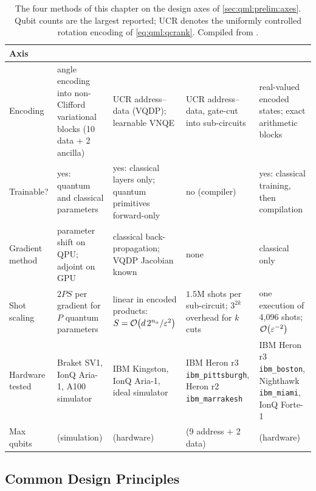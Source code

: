 \begin{table}[htbp]
\caption{The four methods of this chapter on the design axes of \cref{sec:qml:prelim:axes}. Qubit counts are the largest reported; UCR denotes the uniformly controlled rotation encoding of \cref{eq:qml:qcrank}. Compiled from \cite{guo2025qpie,guo2025vqt,guo2025shardq,guo2026nnqa}.}\label{tab:qml:synthesis}
\centering
\footnotesize
\setlength{\tabcolsep}{4pt}
\begin{tabular}{@{}>{\raggedright\arraybackslash}p{1.9cm}>{\raggedright\arraybackslash}p{2.9cm}>{\raggedright\arraybackslash}p{2.9cm}>{\raggedright\arraybackslash}p{2.9cm}>{\raggedright\arraybackslash}p{2.9cm}@{}}
\toprule
Axis & \qpie{} & \vqt{} & \shardq{} & \nnqa{} \\
\midrule
Encoding & angle encoding into non-Clifford variational blocks (10 data $+$ 2 ancilla) & UCR address--data (VQDP); learnable VNQE & UCR address--data, gate-cut into sub-circuits & real-valued encoded states; exact arithmetic blocks \\
\addlinespace
Trainable? & yes: quantum and classical parameters & yes: classical layers only; quantum primitives forward-only & no (compiler) & yes: classical training, then compilation \\
\addlinespace
Gradient method & parameter shift on QPU; adjoint on GPU & classical back-propagation; VQDP Jacobian known & none & classical only \\
\addlinespace
Shot scaling & $2PS$ per gradient for $P$ quantum parameters & linear in encoded products: $S=\mathcal{O}\!\left(d\,2^{n_a}/\varepsilon^2\right)$ & $1.5$M shots per sub-circuit; $3^{2k}$ overhead for $k$ cuts & one execution of 4,096 shots; $\mathcal{O}\!\left(\varepsilon^{-2}\right)$ \\
\addlinespace
Hardware tested & Braket SV1, IonQ Aria-1, A100 simulator & IBM Kingston, IonQ Aria-1, ideal simulator & IBM Heron r3 \texttt{ibm\_pittsburgh}, Heron r2 \texttt{ibm\_marrakesh} & IBM Heron r3 \texttt{ibm\_boston}, Nighthawk \texttt{ibm\_miami}, IonQ Forte-1 \\
\addlinespace
Max qubits & 28 (simulation) & 9 (hardware) & 11 (9 address $+$ 2 data) & 36 (hardware) \\
\bottomrule
\end{tabular}
\end{table}

\subsection{Common Design Principles}\label{sec:qml:synthesis:principles}


